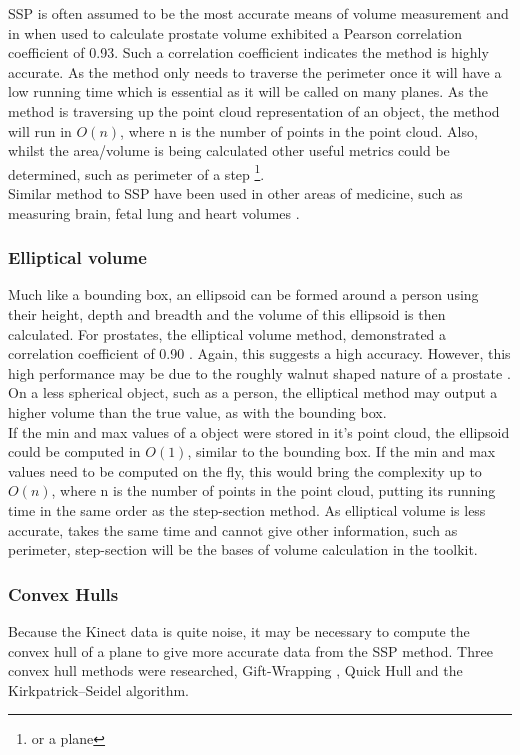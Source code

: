 SSP is often assumed to be the most accurate means of volume measurement and in when used to calculate prostate volume \cite{K1991} exhibited a Pearson correlation coefficient of 0.93. 
Such a correlation coefficient indicates the method is highly accurate.
As the method only needs to traverse the perimeter once it will have a low running time which is essential as it will be called on many planes. As the method is traversing up the point cloud representation of an object, the method will run in $O(n)$, where n is the number of points in the point cloud. Also, whilst the area/volume is being calculated other useful metrics could be determined, such as perimeter of a step \footnote{or a plane}.\\

Similar method to SSP have been used in other areas of medicine, such as measuring brain, fetal lung and heart volumes \cite{Rosen1990,Rypens2001,Graham1971}.\\

\subsubsection{Elliptical volume}
Much like a bounding box, an ellipsoid can be formed around a person using their height, depth and breadth and the volume of this ellipsoid is then calculated.
For prostates, the elliptical volume method, demonstrated a correlation coefficient of 0.90 \cite{K1991}. Again, this suggests a high accuracy.
However, this high performance may be due to the roughly walnut shaped nature of a prostate \cite{D2003}. 
On a less spherical object, such as a person, the elliptical method may output a higher volume than the true value, as with the bounding box.\\

If the min and max values of a object were stored in it's point cloud, the ellipsoid could be computed in $O(1)$, similar to the bounding box. 
If the min and max values need to be computed on the fly, this would bring the complexity up to $O(n)$, where n is the number of points in the point cloud, putting its running time in the same order as the step-section method.
As elliptical volume is less accurate, takes the same time and cannot give other information, such as perimeter, step-section will be the bases of volume calculation in the toolkit.

\subsubsection{Convex Hulls}
Because the Kinect data is quite noise, it may be necessary to compute the convex hull of a plane to give more accurate data from the SSP method. Three convex hull methods were researched, Gift-Wrapping \cite{Cormen2001}, Quick Hull \cite{Barber1996} and the Kirkpatrick–Seidel algorithm.\\

